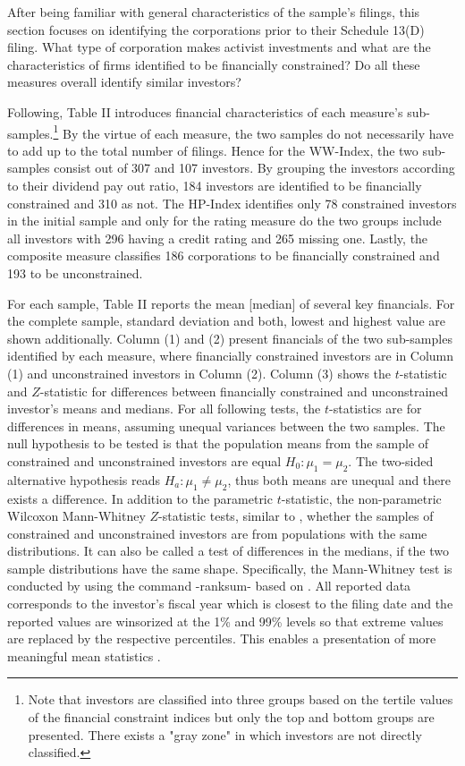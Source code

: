 \documentclass[12pt]{article}
\begin{document}
\noindent After being familiar with general characteristics of the sample's filings, this section focuses on identifying the corporations prior to their Schedule 13(D) filing. What type of corporation makes activist investments and what are the characteristics of firms identified to be financially constrained? Do all these measures overall identify similar investors?\par
Following, Table II introduces financial characteristics of each measure's sub-samples.\footnote{Note that investors are classified into three groups based on the tertile values of the financial constraint indices but only the top and bottom groups are presented. There exists a "gray zone" in which investors are not directly classified.} By the virtue of each measure, the two samples do not necessarily have to add up to the total number of filings. Hence for the WW-Index, the two sub-samples consist out of 307 and 107 investors. By grouping the investors according to their dividend pay out ratio, 184 investors are identified to be financially constrained and 310 as not. The HP-Index identifies only 78 constrained investors in the initial sample and only for the rating measure do the two groups include all investors with 296 having a credit rating and 265 missing one. Lastly, the composite measure classifies 186 corporations to be financially constrained and 193 to be unconstrained.\par
For each sample, Table II reports the mean [median] of several key financials. For the complete sample, standard deviation and both, lowest and highest value are shown additionally. Column (1) and (2) present financials of the two sub-samples identified by each measure, where financially constrained investors are in Column (1) and unconstrained investors in Column (2). Column (3) shows the $t$-statistic and $Z$-statistic for differences between financially constrained and unconstrained investor's means and medians. For all following tests, the $t$-statistics are for differences in means, assuming unequal variances between the two samples. The null hypothesis to be tested is that the population means from the sample of constrained and unconstrained investors are equal $H_{0}: \mu_{1}=\mu_{2}$. The two-sided alternative hypothesis reads $H_{a}: \mu_{1}\neq\mu_{2}$, thus both means are unequal and there exists a difference. In addition to the parametric $t$-statistic, the non-parametric Wilcoxon Mann-Whitney $Z$-statistic tests, similar to \citet[p.201]{Klein2009}, whether the samples of constrained and unconstrained investors are from populations with the same distributions. It can also be called a test of differences in the medians, if the two sample distributions have the same shape. Specifically, the Mann-Whitney test is conducted by using the command -ranksum- based on \citet[p.59]{Mann1947}. All reported data corresponds to the investor's fiscal year which is closest to the filing date and the reported values are winsorized at the 1\% and 99\% levels so that extreme values are replaced by the respective percentiles. This enables a presentation of more meaningful mean statistics \citep[p.203]{Klein2009}.   
\end{document}
